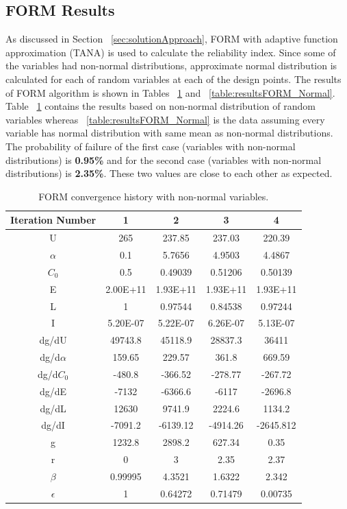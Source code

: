 \documentclass[paper=a4, fontsize=12pt]{scrartcl} %
\begin{document}
\subsection{FORM Results}
As discussed in Section ~\ref{sec:solutionApproach}, FORM with adaptive function approximation (TANA) is used to calculate the reliability index. Since some of the variables had non-normal distributions, approximate normal distribution is calculated for each of random variables at each of the design points. The results of FORM algorithm is shown in Tables ~\ref{table:resultsFORM_eqNormal} and ~\ref{table:resultsFORM_Normal}. Table ~\ref{table:resultsFORM_eqNormal} contains the results based on non-normal distribution of random variables whereas ~\ref{table:resultsFORM_Normal} is the data assuming every variable has normal distribution with same mean as non-normal distributions. The probability of failure of the first case (variables with non-normal distributions) is \textbf{0.95\%} and for the second case (variables with non-normal distributions) is \textbf{2.35\%}. These two values are close to each other as expected.
%
\begin{table}[H]
\centering
\begin{tabular}{ c || c | c | c | c }
	Iteration Number & 1 & 2 & 3 & 4 \\
	\hline
	U & 265 & 237.85 & 237.03 & 220.39 \\
	$\alpha$ & 0.1 & 5.7656 & 4.9503 & 4.4867 \\
	$C_0$ & 0.5 & 0.49039 & 0.51206 & 0.50139 \\
	E & 2.00E+11 & 1.93E+11 & 1.93E+11 & 1.93E+11 \\
	L & 1 & 0.97544 & 0.84538 & 0.97244 \\
	I & 5.20E-07 & 5.22E-07 & 6.26E-07 & 5.13E-07 \\
	dg/dU & 49743.8 & 45118.9 & 28837.3 & 36411 \\
	dg/d$\alpha$ & 159.65 & 229.57 & 361.8 & 669.59 \\
	dg/d$C_0$ & -480.8 & -366.52 & -278.77 & -267.72 \\
	dg/dE & -7132 & -6366.6 & -6117 & -2696.8 \\
	dg/dL & 12630 & 9741.9 & 2224.6 & 1134.2 \\
	dg/dI & -7091.2 & -6139.12 & -4914.26 & -2645.812 \\
	g & 1232.8 & 2898.2 & 627.34 & 0.35 \\
	r & 0 & 3 & 2.35 & 2.37 \\
	$\beta$ & 0.99995 & 4.3521 & 1.6322 & 2.342 \\
	$\epsilon$ & 1 & 0.64272 & 0.71479 & 0.00735 \\
	\hline
\end{tabular}
\caption{FORM convergence history with non-normal variables.}
\label{table:resultsFORM_eqNormal}
\end{table}
\end{document}
